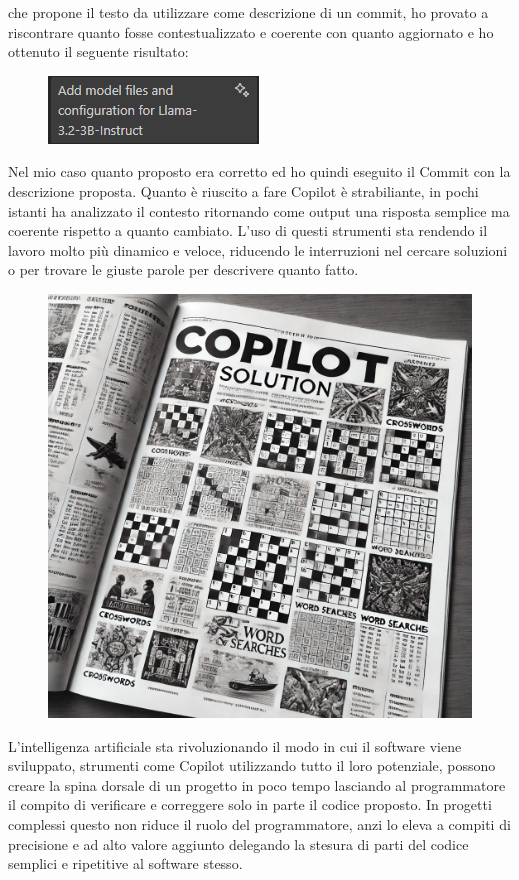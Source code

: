 \documentclass[12pt,a4paper,openright,twoside]{book}
\begin{document}
che propone il testo da utilizzare come descrizione di un commit, ho provato a riscontrare quanto fosse contestualizzato e coerente 
con quanto aggiornato e ho ottenuto il seguente risultato:
\begin{figure}[h]
    \centering
    \includegraphics[width=0.5\linewidth]{figures/commit.png}
    \label{fig:Commit-Autogenerato}
\end{figure}
\newline
Nel mio caso quanto proposto era corretto ed ho quindi eseguito il Commit con la descrizione proposta.
Quanto è riuscito a fare Copilot è strabiliante, in pochi istanti ha analizzato il contesto ritornando come output una risposta semplice ma coerente rispetto a quanto cambiato.
L'uso di questi strumenti sta rendendo il lavoro molto più dinamico e veloce, riducendo le interruzioni nel cercare soluzioni o per trovare le giuste parole per descrivere
quanto fatto.
\begin{figure}[h]
    \centering
    \includegraphics[width=0.5\linewidth]{figures/copilotsolutionSettimanaEnigmistica.png}
    \label{fig:Copilot-Solution}
\end{figure}
\newline
L'intelligenza artificiale sta rivoluzionando il modo in cui il software viene sviluppato, strumenti come Copilot utilizzando tutto il loro potenziale, possono creare la spina dorsale di un progetto
in poco tempo lasciando al programmatore il compito di verificare e correggere solo in parte il codice proposto. 
In progetti complessi questo non riduce il ruolo del programmatore, anzi lo eleva a compiti di precisione e ad alto valore aggiunto delegando la stesura di parti del codice semplici e ripetitive al software stesso.
\end{document}
